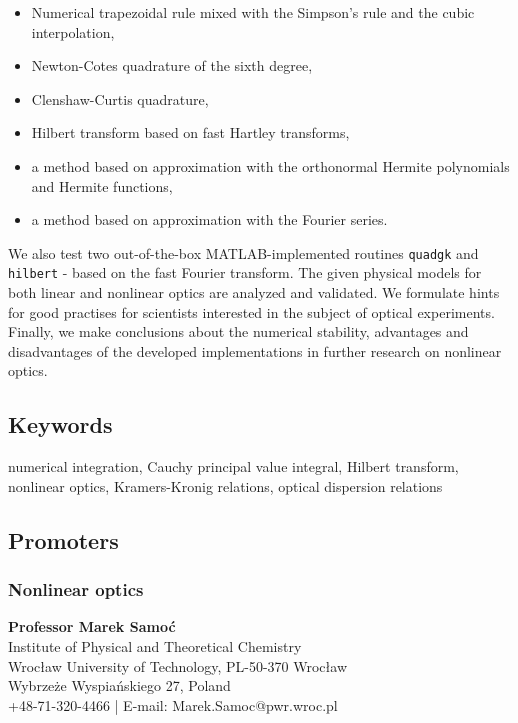 \documentclass[12pt,twoside,a4paper]{article}
\def\emptyline{\vspace{12pt}}
\numberwithin{equation}{subsection}
\numberwithin{figure}{subsection}
\begin{document}
\begin{itemize} \label{used_methods}
 \item Numerical trapezoidal rule mixed with the Simpson's rule and the
cubic interpolation,
 \item Newton-Cotes quadrature of the sixth degree,
 \item Clenshaw-Curtis quadrature,
 \item Hilbert transform based on fast Hartley transforms,
 \item a method based on approximation with the orthonormal Hermite polynomials and Hermite functions,
 \item a method based on approximation with the Fourier series.
\end{itemize}

We also test two out-of-the-box MATLAB-implemented routines \texttt{quadgk} and \texttt{hil\-bert} - based on the fast Fourier
transform. The given physical models for both linear and nonlinear optics are analyzed and validated. We formulate hints for good
practises for scientists interested in the subject of optical experiments. Finally, we make conclusions about the numerical stability, advantages
and disadvantages of the developed implementations in further research on nonlinear optics.

\emptyline

\subsection*{Keywords} \label{chap:abstract_keywords}
numerical integration, Cauchy principal value integral, Hilbert transform, nonlinear optics, Kramers-Kronig relations, optical dispersion
relations

\subsection*{Promoters} \label{chap:abstract_promotors}

\subsubsection*{Nonlinear optics}

\textbf{Professor Marek Samoć} \\
Institute of Physical and Theoretical Chemistry \\
Wrocław University of Technology, PL-50-370 Wrocław \\
Wybrzeże Wyspiańskiego 27, Poland \\
+48-71-320-4466 | E-mail: Marek.Samoc@pwr.wroc.pl
\end{document}
